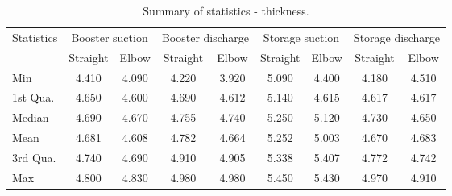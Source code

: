 \begin{table}[h]
	\caption{Summary of statistics - thickness.}
	\label{ch05_tbl_thicknesssta}
	{\footnotesize
\begin{tabular}{l|l|l|l|l|l|l|l|l}
	\hline
	Statistics & \multicolumn{2}{c|}{Booster suction} & \multicolumn{2}{c|}{Booster discharge} & \multicolumn{2}{c|}{Storage suction} & \multicolumn{2}{c}{Storage discharge} \\ 
	\cline{2-9}
	& \multicolumn{1}{c|}{Straight} & \multicolumn{1}{c|}{Elbow} & \multicolumn{1}{c|}{Straight} & \multicolumn{1}{c|}{Elbow} & \multicolumn{1}{c|}{Straight} & \multicolumn{1}{c|}{Elbow} & \multicolumn{1}{c|}{Straight} & \multicolumn{1}{c}{Elbow} \\ 
	\hline
	Min & \multicolumn{1}{c|}{4.410} & \multicolumn{1}{c|}{4.090} & \multicolumn{1}{c|}{4.220} & \multicolumn{1}{c|}{3.920} & \multicolumn{1}{c|}{5.090} & \multicolumn{1}{c|}{4.400 } & \multicolumn{1}{c|}{4.180} & \multicolumn{1}{c}{4.510 } \\ 
	1st Qua. & \multicolumn{1}{c|}{4.650} & \multicolumn{1}{c|}{4.600} & \multicolumn{1}{c|}{4.690} & \multicolumn{1}{c|}{4.612} & \multicolumn{1}{c|}{5.140} & \multicolumn{1}{c|}{4.615 } & \multicolumn{1}{c|}{4.617} & \multicolumn{1}{c}{4.617} \\ 
	Median & \multicolumn{1}{c|}{4.690} & \multicolumn{1}{c|}{4.670} & \multicolumn{1}{c|}{4.755} & \multicolumn{1}{c|}{4.740 } & \multicolumn{1}{c|}{5.250 } & \multicolumn{1}{c|}{5.120} & \multicolumn{1}{c|}{4.730} & \multicolumn{1}{c}{4.650} \\ 
	Mean & \multicolumn{1}{c|}{4.681} & \multicolumn{1}{c|}{4.608} & \multicolumn{1}{c|}{4.782} & \multicolumn{1}{c|}{4.664} & \multicolumn{1}{c|}{5.252} & \multicolumn{1}{c|}{5.003} & \multicolumn{1}{c|}{4.670} & \multicolumn{1}{c}{4.683 } \\ 
	3rd Qua. & \multicolumn{1}{c|}{4.740} & \multicolumn{1}{c|}{4.690} & \multicolumn{1}{c|}{4.910 } & \multicolumn{1}{c|}{4.905} & \multicolumn{1}{c|}{5.338} & \multicolumn{1}{c|}{5.407} & \multicolumn{1}{c|}{4.772} & \multicolumn{1}{c}{4.742 } \\ 
	Max & \multicolumn{1}{c|}{4.800} & \multicolumn{1}{c|}{4.830 } & \multicolumn{1}{c|}{4.980} & \multicolumn{1}{c|}{4.980} & \multicolumn{1}{c|}{5.450} & \multicolumn{1}{c|}{5.430} & \multicolumn{1}{c|}{4.970} & \multicolumn{1}{c}{4.910} \\ 
	\hline
\end{tabular}
	}
\end{table}


